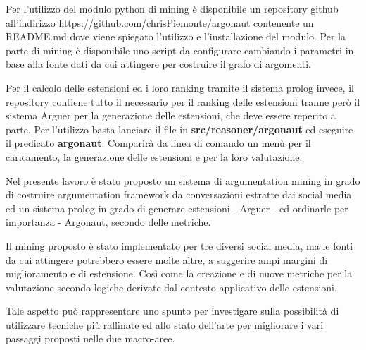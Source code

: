 



Per l'utilizzo del modulo python di mining è disponibile un repository github all'indirizzo \url{https://github.com/chrisPiemonte/argonaut} contenente un README.md dove viene spiegato l'utilizzo e l'installazione del modulo. Per la parte di mining è disponibile uno script da configurare cambiando i parametri in base alla fonte dati da cui attingere per costruire il grafo di argomenti.

Per il calcolo delle estensioni ed i loro ranking tramite il sistema prolog invece, il repository contiene tutto il necessario per il ranking delle estensioni tranne però il sistema Arguer per la generazione delle estensioni, che deve essere reperito a parte. Per l'utilizzo basta lanciare il file in \textbf{src/reasoner/argonaut} ed eseguire il predicato \textbf{argonaut}. Comparirà da linea di comando un menù per il caricamento, la generazione delle estensioni e per la loro valutazione.



Nel presente lavoro è stato proposto un sistema di argumentation mining in grado di costruire argumentation framework da conversazioni estratte dai social media ed un sistema prolog in grado di generare estensioni - Arguer - ed ordinarle per importanza - Argonaut, secondo delle metriche.

Il mining proposto è stato implementato per tre diversi social media, ma le fonti da cui attingere potrebbero essere molte altre, a suggerire ampi margini di miglioramento e di estensione. Così come la creazione e di nuove metriche per la valutazione secondo logiche derivate dal contesto applicativo delle estensioni.

Tale aspetto può rappresentare uno spunto per investigare sulla possibilità di utilizzare tecniche più raffinate ed allo stato dell'arte per migliorare i vari passaggi proposti nelle due macro-aree.



